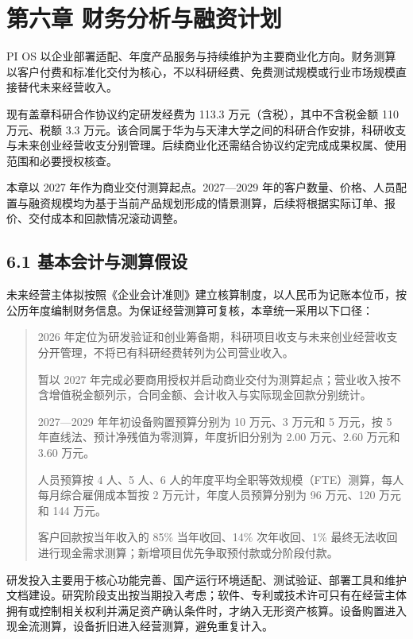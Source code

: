 \section{第六章 财务分析与融资计划}\label{ux7b2cux516dux7ae0-ux8d22ux52a1ux5206ux6790ux4e0eux878dux8d44ux8ba1ux5212}

PI OS 以企业部署适配、年度产品服务与持续维护为主要商业化方向。财务测算以客户付费和标准化交付为核心，不以科研经费、免费测试规模或行业市场规模直接替代未来经营收入。

现有盖章科研合作协议约定研发经费为 113.3 万元（含税），其中不含税金额 110 万元、税额 3.3 万元。该合同属于华为与天津大学之间的科研合作安排，科研收支与未来创业经营收支分别管理。后续商业化还需结合协议约定完成成果权属、使用范围和必要授权核查。

本章以 2027 年作为商业交付测算起点。2027---2029 年的客户数量、价格、人员配置与融资规模均为基于当前产品规划形成的情景测算，后续将根据实际订单、报价、交付成本和回款情况滚动调整。

\subsection{6.1 基本会计与测算假设}\label{ux57faux672cux4f1aux8ba1ux4e0eux6d4bux7b97ux5047ux8bbe}

未来经营主体拟按照《企业会计准则》建立核算制度，以人民币为记账本位币，按公历年度编制财务信息。为保证经营测算可复核，本章统一采用以下口径：

\begin{quote}
2026 年定位为研发验证和创业筹备期，科研项目收支与未来创业经营收支分开管理，不将已有科研经费转列为公司营业收入。

暂以 2027 年完成必要商用授权并启动商业交付为测算起点；营业收入按不含增值税金额列示，合同金额、会计收入与实际现金回款分别统计。

2027---2029 年年初设备购置预算分别为 10 万元、3 万元和 5 万元，按 5 年直线法、预计净残值为零测算，年度折旧分别为 2.00 万元、2.60 万元和 3.60 万元。

人员预算按 4 人、5 人、6 人的年度平均全职等效规模（FTE）测算，每人每月综合雇佣成本暂按 2 万元计，年度人员预算分别为 96 万元、120 万元和 144 万元。

客户回款按当年收入的 85\% 当年收回、14\% 次年收回、1\% 最终无法收回进行现金需求测算；新增项目优先争取预付款或分阶段付款。
\end{quote}

研发投入主要用于核心功能完善、国产运行环境适配、测试验证、部署工具和维护文档建设。研究阶段支出按当期投入考虑；软件、专利或技术许可只有在经营主体拥有或控制相关权利并满足资产确认条件时，才纳入无形资产核算。设备购置进入现金流测算，设备折旧进入经营测算，避免重复计入。

